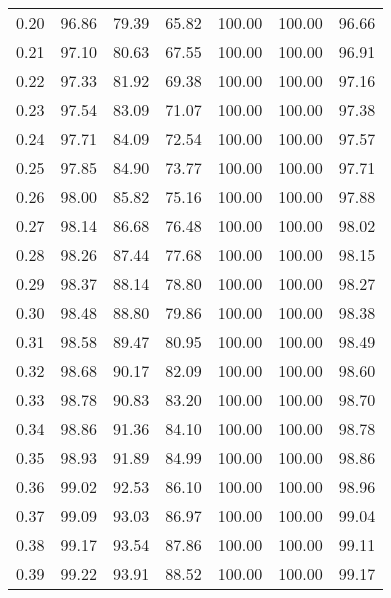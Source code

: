 \begin{tabular}{|c|c|c|c|c|c|c|}
      0.20 &     96.86 &     79.39 &      65.82 &  100.00 &     100.00 &         96.66 \\
      0.21 &     97.10 &     80.63 &      67.55 &  100.00 &     100.00 &         96.91 \\
      0.22 &     97.33 &     81.92 &      69.38 &  100.00 &     100.00 &         97.16 \\
      0.23 &     97.54 &     83.09 &      71.07 &  100.00 &     100.00 &         97.38 \\
      0.24 &     97.71 &     84.09 &      72.54 &  100.00 &     100.00 &         97.57 \\
      0.25 &     97.85 &     84.90 &      73.77 &  100.00 &     100.00 &         97.71 \\
      0.26 &     98.00 &     85.82 &      75.16 &  100.00 &     100.00 &         97.88 \\
      0.27 &     98.14 &     86.68 &      76.48 &  100.00 &     100.00 &         98.02 \\
      0.28 &     98.26 &     87.44 &      77.68 &  100.00 &     100.00 &         98.15 \\
      0.29 &     98.37 &     88.14 &      78.80 &  100.00 &     100.00 &         98.27 \\
      0.30 &     98.48 &     88.80 &      79.86 &  100.00 &     100.00 &         98.38 \\
      0.31 &     98.58 &     89.47 &      80.95 &  100.00 &     100.00 &         98.49 \\
      0.32 &     98.68 &     90.17 &      82.09 &  100.00 &     100.00 &         98.60 \\
      0.33 &     98.78 &     90.83 &      83.20 &  100.00 &     100.00 &         98.70 \\
      0.34 &     98.86 &     91.36 &      84.10 &  100.00 &     100.00 &         98.78 \\
      0.35 &     98.93 &     91.89 &      84.99 &  100.00 &     100.00 &         98.86 \\
      0.36 &     99.02 &     92.53 &      86.10 &  100.00 &     100.00 &         98.96 \\
      0.37 &     99.09 &     93.03 &      86.97 &  100.00 &     100.00 &         99.04 \\
      0.38 &     99.17 &     93.54 &      87.86 &  100.00 &     100.00 &         99.11 \\
      0.39 &     99.22 &     93.91 &      88.52 &  100.00 &     100.00 &         99.17 \\

\end{tabular}
